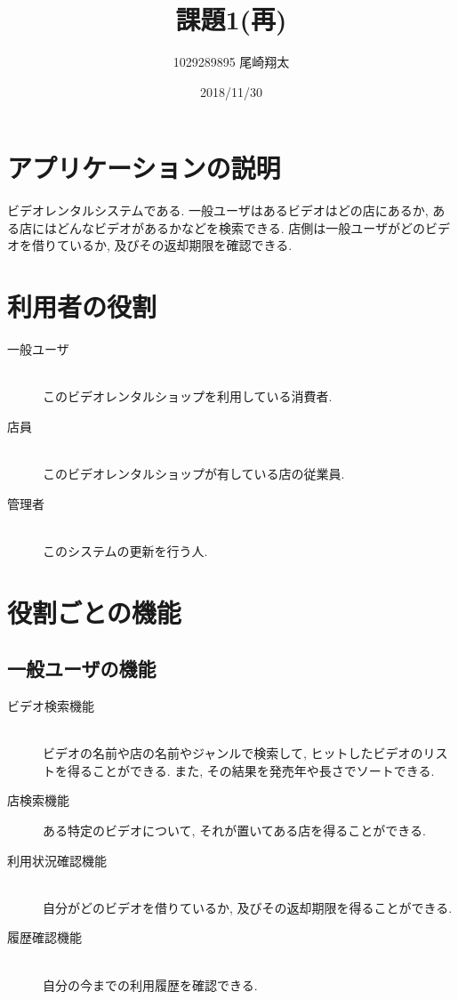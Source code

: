 \documentclass{jarticle}
\begin{document}
\title{課題1(再)}
\author{1029289895 尾崎翔太}
\date{2018/11/30}

\maketitle
\newpage

\section{アプリケーションの説明}
ビデオレンタルシステムである. 一般ユーザはあるビデオはどの店にあるか, ある店にはどんなビデオがあるかなどを検索できる. 店側は一般ユーザがどのビデオを借りているか, 及びその返却期限を確認できる.
\section{利用者の役割}
\begin{description}
\item[一般ユーザ] \leavevmode \\
このビデオレンタルショップを利用している消費者.
\item[店員] \leavevmode \\
このビデオレンタルショップが有している店の従業員.
\item[管理者] \leavevmode \\
このシステムの更新を行う人.
\end{description}
\section{役割ごとの機能}
\subsection{一般ユーザの機能}
\begin{description}
\item[ビデオ検索機能] \leavevmode \\
ビデオの名前や店の名前やジャンルで検索して, ヒットしたビデオのリストを得ることができる. また, その結果を発売年や長さでソートできる.
\item[店検索機能]
ある特定のビデオについて, それが置いてある店を得ることができる.
\item[利用状況確認機能] \leavevmode \\
自分がどのビデオを借りているか, 及びその返却期限を得ることができる.
\item[履歴確認機能] \leavevmode \\
自分の今までの利用履歴を確認できる.
\end{description}
\end{document}
